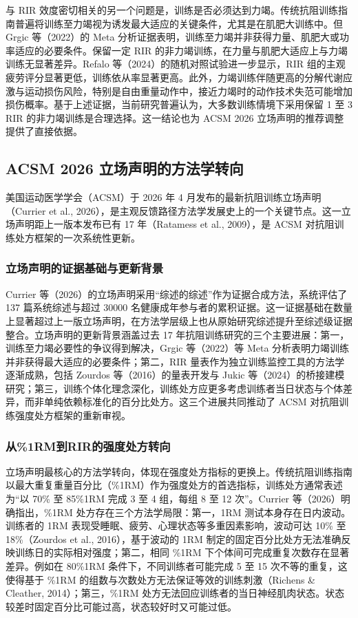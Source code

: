 \documentclass[UTF8,zihao=-4,twoside,openany]{ctexbook}
\begin{document}
与 RIR 效度密切相关的另一个问题是，训练是否必须达到力竭。传统抗阻训练指南普遍将训练至力竭视为诱发最大适应的关键条件，尤其是在肌肥大训练中。但 Grgic 等（2022）的 Meta 分析证据表明，训练至力竭并非获得力量、肌肥大或功率适应的必要条件。保留一定 RIR 的非力竭训练，在力量与肌肥大适应上与力竭训练无显著差异。Refalo 等（2024）的随机对照试验进一步显示，RIR 组的主观疲劳评分显著更低，训练依从率显著更高。此外，力竭训练伴随更高的分解代谢应激与运动损伤风险，特别是自由重量动作中，接近力竭时的动作技术失范可能增加损伤概率。基于上述证据，当前研究普遍认为，大多数训练情境下采用保留 1 至 3 RIR 的非力竭训练是合理选择。这一结论也为 ACSM 2026 立场声明的推荐调整提供了直接依据。

\subsection{ACSM 2026 立场声明的方法学转向}
美国运动医学学会（ACSM）于 2026 年 4 月发布的最新抗阻训练立场声明（Currier et al., 2026），是主观反馈路径方法学发展史上的一个关键节点。这一立场声明距上一版本发布已有 17 年（Ratamess et al., 2009），是 ACSM 对抗阻训练处方框架的一次系统性更新。

\subsubsection{立场声明的证据基础与更新背景}
Currier 等（2026）的立场声明采用“综述的综述”作为证据合成方法，系统评估了 137 篇系统综述与超过 30000 名健康成年参与者的累积证据。这一证据基础在数量上显著超过上一版立场声明，在方法学层级上也从原始研究综述提升至综述级证据整合。立场声明的更新背景涵盖过去 17 年抗阻训练研究的三个主要进展：第一，训练至力竭必要性的争议得到解决，Grgic 等（2022）等 Meta 分析表明力竭训练并非获得最大适应的必要条件；第二，RIR 量表作为独立训练监控工具的方法学逐渐成熟，包括 Zourdos 等（2016）的量表开发与 Jukic 等（2024）的桥接建模研究；第三，训练个体化理念深化，训练处方应更多考虑训练者当日状态与个体差异，而非单纯依赖标准化的百分比处方。这三个进展共同推动了 ACSM 对抗阻训练强度处方框架的重新审视。

\subsubsection{从\%1RM到RIR的强度处方转向}
立场声明最核心的方法学转向，体现在强度处方指标的更换上。传统抗阻训练指南以最大重复重量百分比（\%1RM）作为强度处方的首选指标，训练处方通常表述为“以 70\% 至 85\%1RM 完成 3 至 4 组，每组 8 至 12 次”。Currier 等（2026）明确指出，\%1RM 处方存在三个方法学局限：第一，1RM 测试本身存在日内波动。训练者的 1RM 表现受睡眠、疲劳、心理状态等多重因素影响，波动可达 10\% 至 18\%（Zourdos et al., 2016），基于波动的 1RM 制定的固定百分比处方无法准确反映训练日的实际相对强度；第二，相同 \%1RM 下个体间可完成重复次数存在显著差异。例如在 80\%1RM 条件下，不同训练者可能完成 5 至 15 次不等的重复，这使得基于 \%1RM 的组数与次数处方无法保证等效的训练刺激（Richens \& Cleather, 2014）；第三，\%1RM 处方无法回应训练者的当日神经肌肉状态。状态较差时固定百分比可能过高，状态较好时又可能过低。
\end{document}
